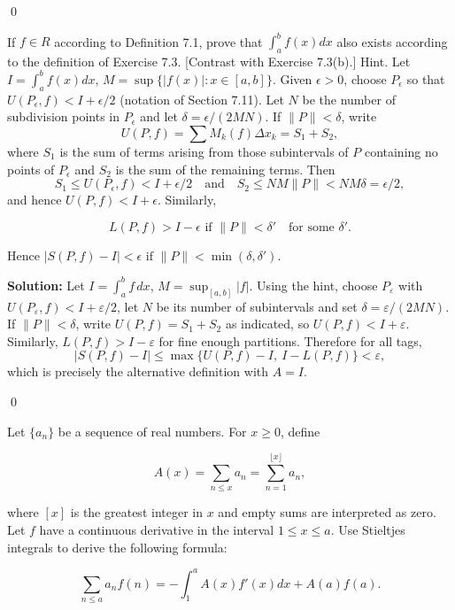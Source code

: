 \qed
\begin{problembox}
If $f \in R$ according to Definition 7.1, prove that $\int_a^b f(x) dx$ also exists according to the definition of Exercise 7.3. [Contrast with Exercise 7.3(b).] Hint. Let $I = \int_a^b f(x) dx$, $M = \sup \{ |f(x)| : x \in [a, b] \}$. Given $\epsilon > 0$, choose $P_\epsilon$ so that $U(P_\epsilon, f) < I + \epsilon/2$ (notation of Section 7.11). Let $N$ be the number of subdivision points in $P_\epsilon$ and let $\delta = \epsilon/(2MN)$. If $\|P\| < \delta$, write 
\[U(P, f) = \sum M_k(f) \Delta x_k = S_1 + S_2,\]
where $S_1$ is the sum of terms arising from those subintervals of $P$ containing no points of $P_\epsilon$ and $S_2$ is the sum of the remaining terms. Then
\[S_1 \leq U(P_\epsilon, f) < I + \epsilon/2 \quad \text{and} \quad S_2 \leq NM \|P\| < NM\delta = \epsilon/2,\]
and hence $U(P, f) < I + \epsilon$. Similarly,

\[ L(P, f) > I - \epsilon \text{ if } \|P\| < \delta' \quad \text{for some } \delta'. \]

Hence $|S(P, f) - I| < \epsilon \text{ if } \|P\| < \min (\delta, \delta')$.
\end{problembox}

\noindent\textbf{Solution:}
Let $I=\int_a^b f\,dx$, $M=\sup_{[a,b]}|f|$. Using the hint, choose $P_\varepsilon$ with $U(P_\varepsilon,f)<I+\varepsilon/2$, let $N$ be its number of subintervals and set $\delta=\varepsilon/(2MN)$. If $\|P\|<\delta$, write $U(P,f)=S_1+S_2$ as indicated, so $U(P,f)<I+\varepsilon$. Similarly, $L(P,f)>I-\varepsilon$ for fine enough partitions. Therefore for all tags,
\[|S(P,f)-I|\le \max\{U(P,f)-I,\ I-L(P,f)\}<\varepsilon,
\]
which is precisely the alternative definition with $A=I$.




\qed
\begin{problembox}
Let $\{a_n\}$ be a sequence of real numbers. For $x \geq 0$, define

\[ A(x) = \sum_{n \leq x} a_n = \sum_{n=1}^{\lfloor x \rfloor} a_n, \]

where $[x]$ is the greatest integer in $x$ and empty sums are interpreted as zero. Let $f$ have a continuous derivative in the interval $1 \leq x \leq a$. Use Stieltjes integrals to derive the following formula:

\[ \sum_{n \leq a} a_n f(n) = -\int_1^a A(x) f'(x) dx + A(a) f(a). \]
\end{problembox}

